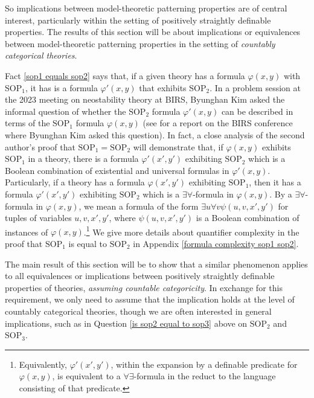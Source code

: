 \documentclass[10pt,a4paper]{amsart}
\begin{document}
So implications between model-theoretic patterning properties are of central interest, particularly within the setting of positively straightly definable properties. The results of this section will be about implications or equivalences between model-theoretic patterning properties in the setting of \textit{countably categorical theories}.


Fact \ref{sop1 equals sop2} says that, if a given theory has a formula $\varphi(x, y)$ with $\mathrm{SOP}_{1}$, it has is a formula $\varphi'(x, y)$ that exhibits $\mathrm{SOP}_{2}$. In a problem session at the 2023 meeting on neostability theory at BIRS, Byunghan Kim asked the informal question of whether the $\mathrm{SOP}_{2}$ formula $\varphi'(x, y)$ can be described in terms of the $\mathrm{SOP}_{1}$ formula $\varphi(x, y)$ (see \cite{BIRS23w5145} for a report on the BIRS conference where Byunghan Kim asked this question). In fact, a close analysis of the second author's proof that $\mathrm{SOP}_{1} = \mathrm{SOP}_{2}$ will demonstrate that, if $\varphi(x, y)$ exhibits $\mathrm{SOP}_{1}$ in a theory, there is a formula $\varphi'(x', y')$ exhibiting $\mathrm{SOP}_{2}$  which is a Boolean combination of existential and universal formulas in $\varphi'(x, y)$. Particularly, if a theory has a formula $\varphi(x', y')$ exhibiting $\mathrm{SOP}_{1}$, then it has a formula $\varphi'(x', y')$ exhibiting $\mathrm{SOP}_{2}$ which is a $\exists\forall$-formula in $\varphi(x, y)$. By a $\exists\forall$-formula in $\varphi(x, y)$, we mean a formula of the form $\exists u \forall v \psi(u, v, x', y')$ for tuples of variables $u, v, x', y'$, where $\psi(u, v, x', y')$ is a Boolean combination of instances of $\varphi(x, y)$.\footnote{Equivalently, $\varphi'(x', y')$, within the expansion by a definable predicate for $\varphi(x, y)$, is equivalent to a $\forall\exists$-formula in the reduct to the language consisting of that predicate.} We give more details about quantifier complexity in the proof that $\mathrm{SOP}_{1}$ is equal to $\mathrm{SOP}_{2}$ in Appendix \ref{formula complexity sop1 sop2}.


The main result of this section will be to show that a similar phenomenon applies to all equivalences or implications between positively straightly definable properties of theories, \textit{assuming countable categoricity}. In exchange for this requirement, we only need to assume that the implication holds at the level of countably categorical theories, though we are often interested in general implications, such as in Question \ref{is sop2 equal to sop3} above on $\mathrm{SOP}_{2}$ and $\mathrm{SOP}_{3}$.
\end{document}
